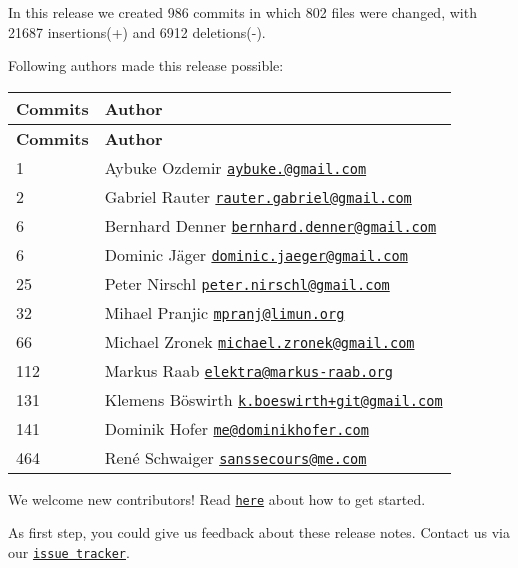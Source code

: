 In this release we created 986 commits in which 802 files were changed, with 21687 insertions(+) and 6912 deletions(-\/).

Following authors made this release possible\+:

\tabulinesep=1mm
\begin{longtabu} spread 0pt [c]{*{2}{|X[-1]}|}
\hline
\rowcolor{\tableheadbgcolor}\textbf{ Commits }&\textbf{ Author  }\\
\endfirsthead
\hline
\endfoot
\hline
\rowcolor{\tableheadbgcolor}\textbf{ Commits }&\textbf{ Author  }\\
 &Aybuke Ozdemir \href{mailto:aybuke.147@gmail.com}{\tt aybuke.@gmail.\+com} \\
2 &Gabriel Rauter \href{mailto:rauter.gabriel@gmail.com}{\tt rauter.\+gabriel@gmail.\+com} \\
6 &Bernhard Denner \href{mailto:bernhard.denner@gmail.com}{\tt bernhard.\+denner@gmail.\+com} \\
6 &Dominic Jäger \href{mailto:dominic.jaeger@gmail.com}{\tt dominic.\+jaeger@gmail.\+com} \\
25 &Peter Nirschl \href{mailto:peter.nirschl@gmail.com}{\tt peter.\+nirschl@gmail.\+com} \\
32 &Mihael Pranjic \href{mailto:mpranj@limun.org}{\tt mpranj@limun.\+org} \\
66 &Michael Zronek \href{mailto:michael.zronek@gmail.com}{\tt michael.\+zronek@gmail.\+com} \\
112 &Markus Raab \href{mailto:elektra@markus-raab.org}{\tt elektra@markus-\/raab.\+org} \\
131 &Klemens Böswirth \href{mailto:k.boeswirth+git@gmail.com}{\tt k.\+boeswirth+git@gmail.\+com} \\
141 &Dominik Hofer \href{mailto:me@dominikhofer.com}{\tt me@dominikhofer.\+com} \\
464 &René Schwaiger \href{mailto:sanssecours@me.com}{\tt sanssecours@me.\+com} \\
\end{longtabu}


We welcome new contributors! Read \href{https://www.libelektra.org/devgettingstarted/ideas}{\tt here} about how to get started.

As first step, you could give us feedback about these release notes. Contact us via our \href{https://issues.libelektra.org}{\tt issue tracker}.

